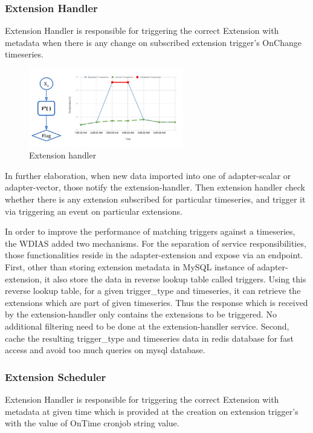 \subsubsection{Extension Handler}
Extension Handler is responsible for triggering the correct Extension with metadata when there is any change on subscribed extension trigger's OnChange timeseries.
\begin{figure}[htp]
    \centering
    \includegraphics[width=0.6\textwidth]{method/data_preprocess/validation.jpg}
    \caption{Extension handler}
    \label{fi:extension_handler}
\end{figure}

In further elaboration, when new data imported into one of adapter-scalar or adapter-vector, those notify the extension-handler. Then extension handler check whether there is any extension subscribed for particular timeseries, and trigger it via triggering an event on particular extensions.

In order to improve the performance of matching triggers against a timeseries, the WDIAS added two mechanisms. For the separation of service responsibilities, those functionalities reside in the adapter-extension and expose via an endpoint.
First, other than storing extension metadata in MySQL instance of adapter-extension, it also store the data in reverse lookup table called triggers. Using this reverse lookup table, for a given trigger\_type and timeseries, it can retrieve the extensions which are part of given timeseries. Thus the response which is received by the 
extension-handler only contains the extensions to be triggered. No additional filtering need to be done at the extension-handler service.
Second, cache the resulting trigger\_type and timeseries data in \acrshort{redis} database for fast access and avoid too much queries on \acrshort{mysql} database.

\subsubsection{Extension Scheduler}
Extension Handler is responsible for triggering the correct Extension with metadata at given time which is provided at the creation on extension trigger's with the value of OnTime cronjob string value.

